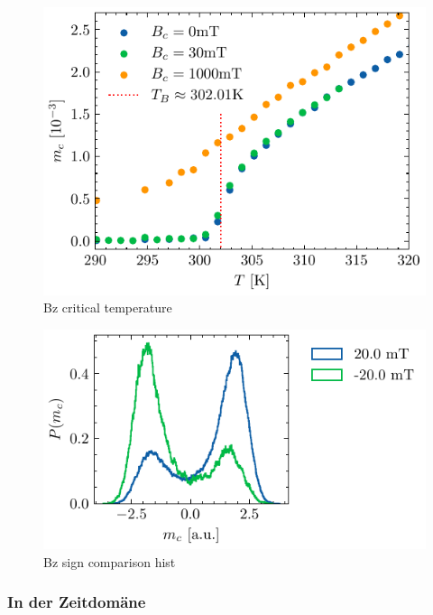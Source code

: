 \documentclass[main.tex]{subfiles}
\begin{document}
\begin{figure}[H]
    \centering
    \includegraphics{bilder/plots/Bz_comparison/critical_temperature.pdf}
    \caption{Bz critical temperature }\label{fig:bz-crit-temp}
\end{figure}


\begin{figure}[H]
    \centering
    \includegraphics{bilder/plots/Bz_sign_comparison/20mT_hist_comp.pdf}
    \caption{Bz sign comparison hist}\label{fig:bz-sign-hist}
\end{figure}


\subsubsection{In der Zeitdomäne}
\end{document}

